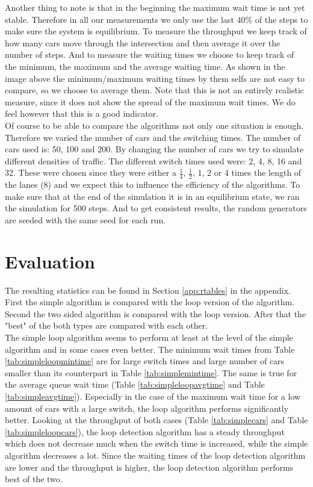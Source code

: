 \documentclass[a4paper,11pt]{article}
\begin{document}
\noindent Another thing to note is that in the beginning the maximum wait time is not yet stable.
Therefore in all our measurements we only use the last $40\%$ of the steps to make sure the system is equilibrium.
To measure the throughput we keep track of how many cars move through the intersection and then average it over the number of steps.
And to measure the waiting times we choose to keep track of the minimum, the maximum and the average waiting time.
As shown in the image above the minimum/maximum waiting times by them selfs are not easy to compare, so we choose to average them.
Note that this is not an entirely realistic measure, since it does not show the spread of the maximum wait times.
We do feel however that this is a good indicator.\\


\noindent Of course to be able to compare the algorithms not only one situation is enough.
Therefore we varied the number of cars and the switching times.
The number of cars used is: 50, 100 and 200.
By changing the number of cars we try to simulate different densities of traffic.
The different switch times used were: 2, 4, 8, 16 and 32.
These were chosen since they were either a $\frac{1}{4}$, $\frac{1}{2}$, 1, 2 or 4 times the length of the lanes (8) and we expect this to influence the efficiency of the algorithms.
To make sure that at the end of the simulation it is in an equilibrium state, we ran the simulation for 500 steps.
And to get consistent results, the random generators are seeded with the same seed for each run.

\section{Evaluation}\label{sec:eval}

The resulting statistics can be found in Section \ref{app:rtables} in the appendix.
First the simple algorithm is compared with the loop version of the algorithm.
Second the two sided algorithm is compared with the loop version.
After that the "best" of the both types are compared with each other.\\

\noindent The simple loop algorithm seems to perform at least at the level of the simple algorithm
and in some cases even better. The minimum wait times from Table \ref{tab:simpleloopmintime} are for large switch times and large number of cars smaller
than its counterpart in Table \ref{tab:simplemintime}. The same is true for the average queue wait time (Table \ref{tab:simpleloopavgtime} and Table \ref{tab:simpleavgtime}).
Especially in the case of the maximum wait time for a low amount of cars with a large switch, the loop algorithm performs significantly better.
Looking at the throughput of both cases (Table \ref{tab:simplecars} and Table \ref{tab:simpleloopcars}), the loop detection algorithm has 
a steady throughput which does not decrease much when the switch time is increased, while the simple algorithm decreases a lot.
Since the waiting times of the loop detection algorithm are lower and the throughput is higher, the loop detection algorithm performs best of the two.\\
\end{document}
